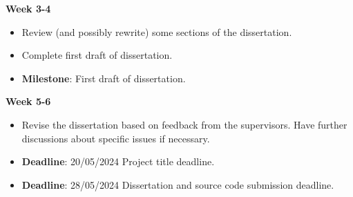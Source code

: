 \textbf{Week 3-4}
\begin{itemize}
    \item Review (and possibly rewrite) some sections of the dissertation.
    \item Complete first draft of dissertation.
    \item \textbf{Milestone}: First draft of dissertation.
\end{itemize}

\textbf{Week 5-6}
\begin{itemize}
    \item Revise the dissertation based on feedback from the supervisors. Have further discussions about specific issues if necessary.
    \item \textbf{Deadline}: 20/05/2024 Project title deadline.
    \item \textbf{Deadline}: 28/05/2024 Dissertation and source code submission deadline.
\end{itemize}